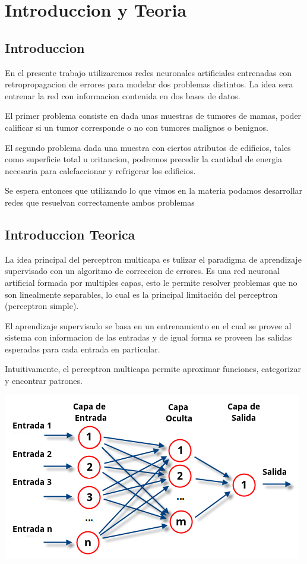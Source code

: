 \section{Introduccion y Teoria}
\subsection{Introduccion}
En el presente trabajo utilizaremos redes neuronales artificiales entrenadas con retropropagacion de errores para modelar dos problemas distintos. La idea sera entrenar la red con informacion contenida en dos bases de datos.

El primer problema consiste en dada unas muestras de tumores de mamas, poder calificar si un tumor corresponde o no con tumores malignos o benignos.

El segundo problema dada una muestra con ciertos atributos de edificios, tales como superficie total u oritancion, podremos precedir la cantidad de energia necesaria para calefaccionar y refrigerar los edificios.

Se espera entonces que utilizando lo que vimos en la materia podamos desarrollar redes que resuelvan correctamente ambos problemas

\subsection{Introduccion Teorica}
La idea principal del perceptron multicapa es tulizar el paradigma de aprendizaje supervisado con un algoritmo de correccion de errores. Es una red neuronal artificial formada por multiples capas, esto le permite resolver problemas que no son linealmente separables, lo cual es la principal limitación del perceptron (perceptron simple).

El aprendizaje supervisado se basa en un entrenamiento en el cual se provee al sistema con informacion de las entradas y de igual forma se proveen las salidas esperadas para cada entrada en particular.

Intuitivamente, el perceptron multicapa permite aproximar funciones, categorizar y encontrar patrones.


\begin{center}
\includegraphics{img/pmulticapa}
\end{center}

